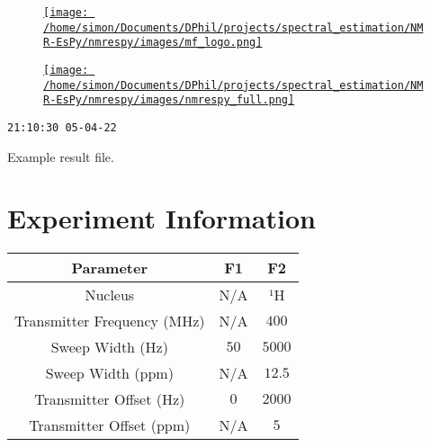 \documentclass[8pt]{article}
\begin{document}
\begin{figure}[!ht]
\begin{minipage}[b][2.5cm][c]{.72\textwidth}
\href{http://foroozandeh.chem.ox.ac.uk/home}%
{\texttt{[image: /home/simon/Documents/DPhil/projects/spectral\_estimation/NMR-EsPy/nmrespy/images/mf\_logo.png]}}
\end{minipage}
\begin{minipage}[b][2.5cm][c]{.27\textwidth}
\href{https://foroozandehgroup.github.io/NMR-EsPy}%
{\texttt{[image: /home/simon/Documents/DPhil/projects/spectral\_estimation/NMR-EsPy/nmrespy/images/nmrespy\_full.png]}}
\end{minipage}
\end{figure}
\texttt{21:10:30 05-04-22}

Example result file.

\section*{Experiment Information}
\begin{longtable}[l]{c c c}
\toprule
Parameter & F1 & F2\\
\midrule
Nucleus & N/A & ¹H\\
Transmitter Frequency (MHz) & N/A & $\num{400}$\\
Sweep Width (Hz) & $\num{50}$ & $\num{5000}$\\
Sweep Width (ppm) & N/A & $\num{12.5}$\\
Transmitter Offset (Hz) & $\num{0}$ & $\num{2000}$\\
Transmitter Offset (ppm) & N/A & $\num{5}$\\
\bottomrule
\end{longtable}
\end{document}
